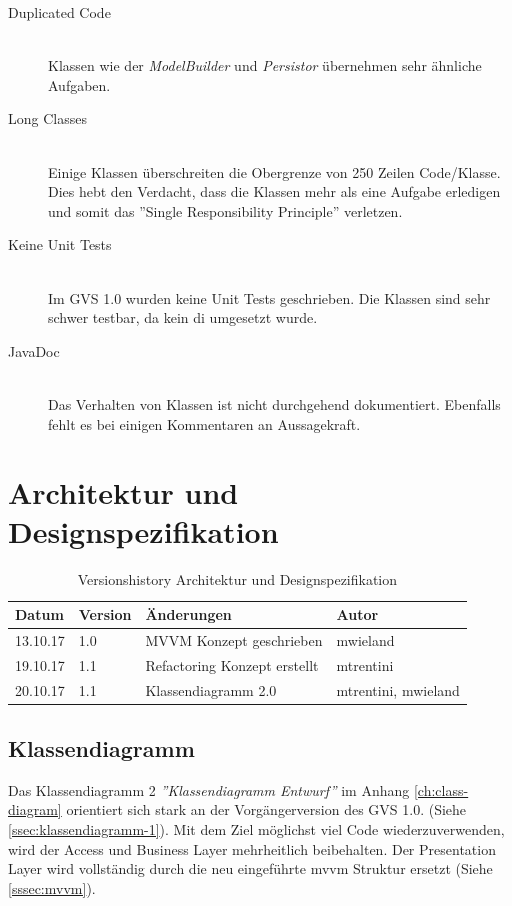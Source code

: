 \documentclass[11pt,a4paper,english,oneside]{book}
\numberwithin{equation}{chapter}
\begin{document}
\begin{description}
	\item[Duplicated Code] \hfill \\
	Klassen wie der \textit{ModelBuilder} und \textit{Persistor} übernehmen sehr ähnliche Aufgaben.
	
	\item[Long Classes] \hfill \\
	Einige Klassen überschreiten die Obergrenze von 250 Zeilen Code/Klasse. Dies hebt den Verdacht, dass die Klassen mehr als eine Aufgabe erledigen und somit das ''Single Responsibility Principle'' verletzen.
	
	\item[Keine Unit Tests] \hfill \\
	Im GVS 1.0 wurden keine Unit Tests geschrieben. Die Klassen sind sehr schwer testbar, da kein \gls{di} umgesetzt wurde.
	
	\item[JavaDoc] \hfill \\
	Das Verhalten von Klassen ist nicht durchgehend dokumentiert.  Ebenfalls fehlt es bei einigen Kommentaren an Aussagekraft.
	
	\end{description}	

		
	\chapter{Architektur und Designspezifikation}
	\label{ch:design-spec}
	
	\begin{table}[h!]
		\centering
		\begin{tabularx}{\linewidth}{l l X l}
			\toprule 
			Datum & Version & Änderungen & Autor \\
			\midrule
			13.10.17 & 1.0 & MVVM Konzept geschrieben & mwieland \\
			19.10.17 & 1.1 & Refactoring Konzept erstellt & mtrentini \\
			20.10.17 & 1.1 & Klassendiagramm 2.0 & mtrentini, mwieland \\
			\bottomrule 
		\end{tabularx} 
		\caption{Versionshistory Architektur und Designspezifikation} 
	\end{table}
	
	
	
	\section{Klassendiagramm} \label{sec:class-diagram}
	Das Klassendiagramm 2 \textit{''Klassendiagramm Entwurf''} im Anhang \ref{ch:class-diagram} orientiert sich stark an der Vorgängerversion des GVS 1.0. (Siehe \ref{ssec:klassendiagramm-1}). Mit dem Ziel möglichst viel Code wiederzuverwenden, wird der Access und Business Layer mehrheitlich beibehalten. Der Presentation Layer wird vollständig durch die neu eingeführte \gls{mvvm} Struktur ersetzt (Siehe \ref{sssec:mvvm}).
	
\end{document}
